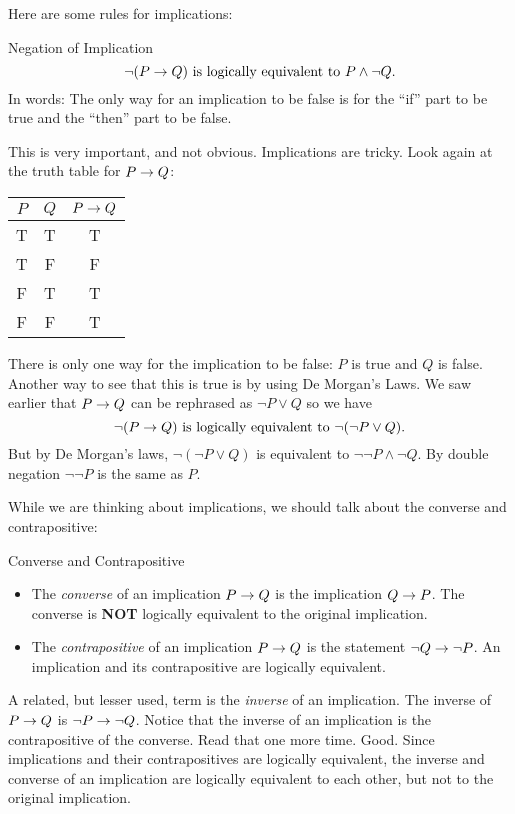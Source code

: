 \documentclass[12pt]{article}
\begin{document}
Here are some rules for implications:

\begin{defbox}{Negation of Implication}
  \[\neg(P \rightarrow Q) \mbox{ is logically equivalent to } P \wedge \neg Q.\]
  In words: The only way for an implication to be false is for the ``if'' part to be true and the ``then'' part to be false.
\end{defbox}

This is very important, and not obvious. Implications are tricky.  Look again at the truth table for $P \rightarrow Q$:

\begin{center}
\begin{tabular}{c|c|c}
 $P$ & $Q$ & $P\rightarrow Q$ \\ \hline
 T & T & T\\
 T & F & F\\
 F & T & T\\
 F & F & T
\end{tabular}
\end{center}

There is only one way for the implication to be false: $P$ is true and $Q$ is false.  Another way to see that this is true is by using De Morgan's Laws.  We saw earlier that $P \rightarrow Q$ can be rephrased as $\neg P \vee Q$ so we have
\[\neg (P \rightarrow Q) \mbox{ is logically equivalent to } \neg( \neg P \vee Q).\]
But by De Morgan's laws, $\neg( \neg P \vee Q)$ is equivalent to $\neg \neg P \wedge \neg Q$.  By double negation $\neg \neg P$ is the same as $P$.

While we are thinking about implications, we should talk about the converse and contrapositive:

\begin{defbox}{Converse and Contrapositive}
  \begin{itemize}
    \item The {\em converse} of an implication $P \rightarrow Q$ is the implication $Q \rightarrow P$.  The converse is \textbf{NOT} logically equivalent to the original implication.
    \item The {\em contrapositive} of an implication $P \rightarrow Q$ is the statement $\neg Q \rightarrow \neg P$.  An implication and its contrapositive are logically equivalent.
  \end{itemize}

\end{defbox}

A related, but lesser used, term is the {\em inverse} of an implication.  The inverse of $P \rightarrow Q$ is $\neg P \rightarrow \neg Q$.  Notice that the inverse of an implication is the contrapositive of the converse.  Read that one more time.   Good.  Since implications and their contrapositives are logically equivalent, the inverse and converse of an implication are logically equivalent to each other, but not to the original implication.
\end{document}
